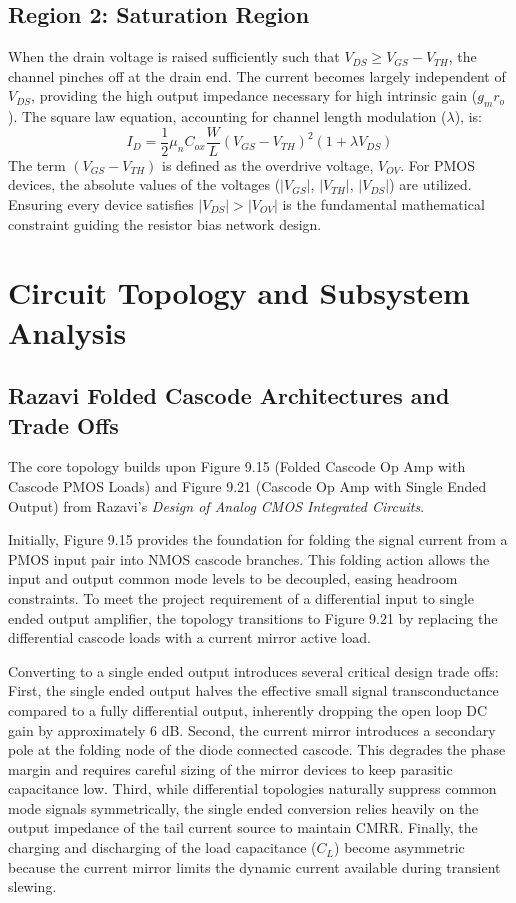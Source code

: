 \documentclass[conference]{IEEEtran}
\begin{document}
\subsection{Region 2: Saturation Region}
When the drain voltage is raised sufficiently such that $V_{DS} \ge V_{GS} - V_{TH}$, the channel pinches off at the drain end. The current becomes largely independent of $V_{DS}$, providing the high output impedance necessary for high intrinsic gain ($g_m r_o$). The square law equation, accounting for channel length modulation ($\lambda$), is:
\begin{equation}
    I_D = \frac{1}{2} \mu_n C_{ox} \frac{W}{L} (V_{GS} - V_{TH})^2 (1 + \lambda V_{DS})
\end{equation}
The term $(V_{GS} - V_{TH})$ is defined as the overdrive voltage, $V_{OV}$. For PMOS devices, the absolute values of the voltages ($|V_{GS}|$, $|V_{TH}|$, $|V_{DS}|$) are utilized. Ensuring every device satisfies $|V_{DS}| > |V_{OV}|$ is the fundamental mathematical constraint guiding the resistor bias network design.

\section{Circuit Topology and Subsystem Analysis}

\subsection{Razavi Folded Cascode Architectures and Trade Offs}
The core topology builds upon Figure 9.15 (Folded Cascode Op Amp with Cascode PMOS Loads) and Figure 9.21 (Cascode Op Amp with Single Ended Output) from Razavi's \textit{Design of Analog CMOS Integrated Circuits}. 

Initially, Figure 9.15 provides the foundation for folding the signal current from a PMOS input pair into NMOS cascode branches. This folding action allows the input and output common mode levels to be decoupled, easing headroom constraints. To meet the project requirement of a differential input to single ended output amplifier, the topology transitions to Figure 9.21 by replacing the differential cascode loads with a current mirror active load. 

Converting to a single ended output introduces several critical design trade offs:
First, the single ended output halves the effective small signal transconductance compared to a fully differential output, inherently dropping the open loop DC gain by approximately 6 dB. Second, the current mirror introduces a secondary pole at the folding node of the diode connected cascode. This degrades the phase margin and requires careful sizing of the mirror devices to keep parasitic capacitance low. Third, while differential topologies naturally suppress common mode signals symmetrically, the single ended conversion relies heavily on the output impedance of the tail current source to maintain CMRR. Finally, the charging and discharging of the load capacitance ($C_L$) become asymmetric because the current mirror limits the dynamic current available during transient slewing.
\end{document}
